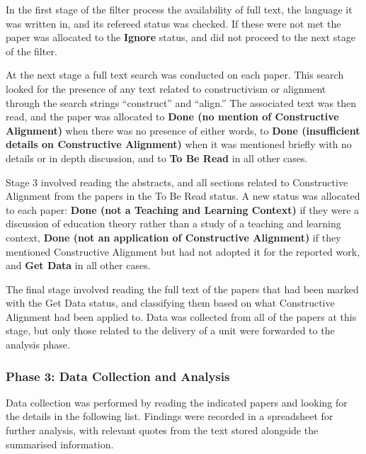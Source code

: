 In the first stage of the filter process the availability of full text, the language it was written in, and its refereed status was checked. If these were not met the paper was allocated to the \textbf{Ignore} status, and did not proceed to the next stage of the filter. 

At the next stage a full text search was conducted on each paper. This search looked for the presence of any text related to constructivism or alignment through the search strings ``construct'' and ``align.'' The associated text was then read, and the paper was allocated to \textbf{Done (no mention of Constructive Alignment)} when there was no presence of either words, to \textbf{Done (insufficient details on Constructive Alignment)} when it was mentioned briefly with no details or in depth discussion, and to \textbf{To Be Read} in all other cases. %

Stage 3 involved reading the abstracts, and all sections related to Constructive Alignment from the papers in the To Be Read status. A new status was allocated to each paper: \textbf{Done (not a Teaching and Learning Context)} if they were a discussion of education theory rather than a study of a teaching and learning context, \textbf{Done (not an application of Constructive Alignment)} if they mentioned Constructive Alignment but had not adopted it for the reported work, and \textbf{Get Data} in all other cases.

The final stage involved reading the full text of the papers that had been marked with the Get Data status, and classifying them based on what Constructive Alignment had been applied to. Data was collected from all of the papers at this stage, but only those related to the delivery of a unit were forwarded to the analysis phase.


\subsubsection{Phase 3: Data Collection and Analysis} %
\label{ssub:data_collection_and_analysis}

Data collection was performed by reading the indicated papers and looking for the details in the following list. Findings were recorded in a spreadsheet for further analysis, with relevant quotes from the text stored alongside the summarised information.

